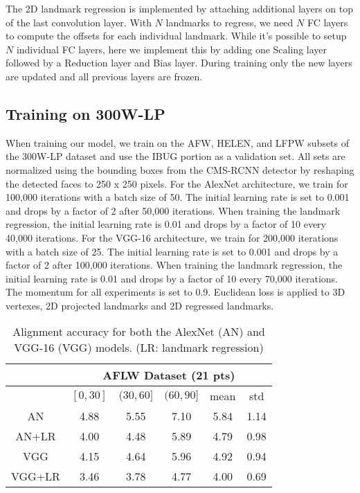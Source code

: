 \documentclass[10pt,twocolumn,letterpaper]{article}
\begin{document}
The 2D landmark regression is implemented by attaching additional layers on top of the last convolution layer. With $N$ landmarks to regress, we need $N$ FC layers to compute the offsets for each individual landmark. While it's possible to setup $N$ individual FC layers, here we implement this by adding one Scaling layer followed by a Reduction layer and Bias layer. During training only the new layers are updated and all previous layers are frozen.

\subsection{Training on 300W-LP}
When training our model, we train on the AFW, HELEN, and LFPW subsets of the 300W-LP dataset and use the IBUG portion as a validation set. All sets are normalized using the bounding boxes from the CMS-RCNN detector by reshaping the detected faces to 250 x 250 pixels.
For the AlexNet architecture, we train for 100,000 iterations with a batch size of 50. The initial learning rate is set to 0.001 and drops by a factor of 2 after 50,000 iterations. When training the landmark regression, the initial learning rate is 0.01 and drops by a factor of 10 every 40,000 iterations. 
For the VGG-16 architecture, we train for 200,000 iterations with a batch size of 25. The initial learning rate is set to 0.001 and drops by a factor of 2 after 100,000 iterations. When training the landmark regression, the initial learning rate is 0.01 and drops by a factor of 10 every 70,000 iterations. 
The momentum for all experiments is set to 0.9. Euclidean loss is applied to 3D vertexes, 2D projected landmarks and 2D regressed landmarks.


\begin{table}[t!]
\centering
\caption{Alignment accuracy for both the AlexNet (AN) and VGG-16 (VGG) models. (LR: landmark regression)}
\label{tab:ablation}
\begin{tabular}{|c||c|c|c|c|c|}
\hline
 & \multicolumn{5}{c|}{AFLW Dataset (21 pts)} \\ \hline
 & $[0, 30]$ & $(30, 60]$ & $(60, 90]$ & mean & std \\ \hline \hline
AN & 4.88 & 5.55 & 7.10 & 5.84 & 1.14 \\ \hline
AN+LR & 4.00 & 4.48 & 5.89 & 4.79 & 0.98 \\ \hline \hline
VGG & 4.15 & 4.64 & 5.96 & 4.92 & 0.94 \\ \hline
VGG+LR & 3.46 & 3.78 & 4.77 & 4.00 & 0.69 \\ \hline
\end{tabular}
\end{table}
\end{document}
